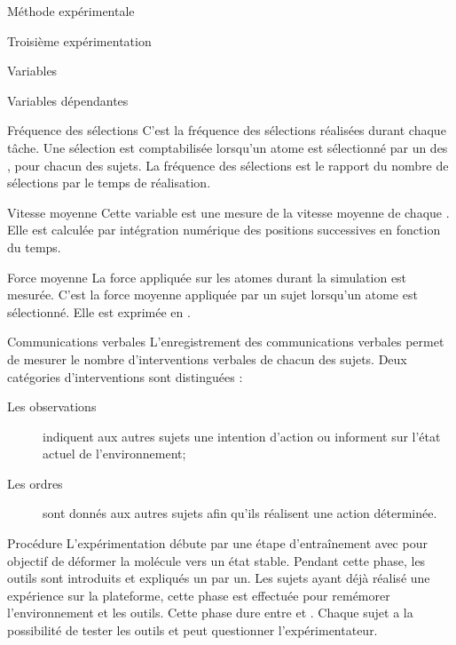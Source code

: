 \documentclass[myfrancais,ngerman,english,french]{mythesis}
\begin{document}
\begin{mychapter}{Méthode expérimentale}
\begin{mysection}{Troisième expérimentation}
\begin{mysubsection}{Variables}
\begin{mysubsubsection}{Variables dépendantes}
\begin{myparagraph}{ Fréquence des sélections}
						C'est la fréquence des sélections réalisées durant chaque tâche.
						Une sélection est comptabilisée lorsqu'un atome est sélectionné par un des , pour chacun des sujets.
						La fréquence des sélections est le rapport du nombre de sélections par le temps de réalisation.
					\end{myparagraph}
					\begin{myparagraph}{ Vitesse moyenne}
						Cette variable est une mesure de la vitesse moyenne de chaque .
						Elle est calculée par intégration numérique des positions successives en fonction du temps.
					\end{myparagraph}
					\begin{myparagraph}{ Force moyenne}
						La force appliquée sur les atomes durant la simulation est mesurée.
						C'est la force moyenne appliquée par un sujet lorsqu'un atome est sélectionné.
						Elle est exprimée en .
					\end{myparagraph}
					\begin{myparagraph}{ Communications verbales}
						L'enregistrement des communications verbales permet de mesurer le nombre d'interventions verbales de chacun des sujets.
						Deux catégories d'interventions sont distinguées :
						\begin{description}
							\item[Les observations] indiquent aux autres sujets une intention d'action ou informent sur l'état actuel de l'environnement;
							\item[Les ordres] sont donnés aux autres sujets afin qu'ils réalisent une action déterminée.
						\end{description}
					\end{myparagraph}
				\end{mysubsubsection}
			\end{mysubsection}
			\begin{mysubsection}{Procédure}
				L'expérimentation débute par une étape d'entraînement avec pour objectif de déformer la molécule \myTRPCAGE vers un état stable.
				Pendant cette phase, les outils sont introduits et expliqués un par un.
				Les sujets ayant déjà réalisé une expérience sur la plateforme, cette phase est effectuée pour remémorer l'environnement et les outils.
				Cette phase dure entre  et .
				Chaque sujet a la possibilité de tester les outils et peut questionner l'expérimentateur.


\end{mysubsection}
\end{mysection}
\end{mychapter}
\end{document}
